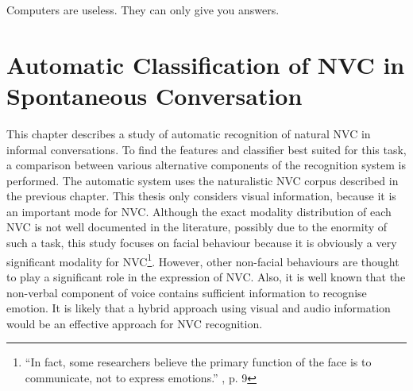 
\begin{savequote}
Computers are useless. They can only give you answers.
\end{savequote}

\chapter[Automatic Classification of NVC]{Automatic Classification of NVC in Spontaneous Conversation}
\label{ChapterClassification}
\label{SectionClassificationIntro}


This chapter describes a study of automatic recognition of natural \ac{NVC} in informal conversations. To find the features and classifier best suited for this task, a comparison between various alternative components of the recognition system is performed. The automatic system uses the naturalistic \ac{NVC} corpus described in the previous chapter.
This thesis only considers visual information, because it is an important mode for \ac{NVC}. Although the exact modality distribution of each \ac{NVC} is not well documented in the literature, possibly due to the enormity of such a task, this study focuses on facial behaviour because it is obviously a very significant modality for \ac{NVC}\footnote{``In fact, some researchers believe the primary function of the face is to communicate, not to express emotions.'' \cite{Knapp2009}, p. 9}. However, other non-facial behaviours are thought to play a significant role in the expression of \ac{NVC}. Also, it is well known that the non-verbal component of voice contains sufficient information to recognise emotion. %
It is likely that a hybrid approach using visual and audio information would be an effective approach for \ac{NVC} recognition.

